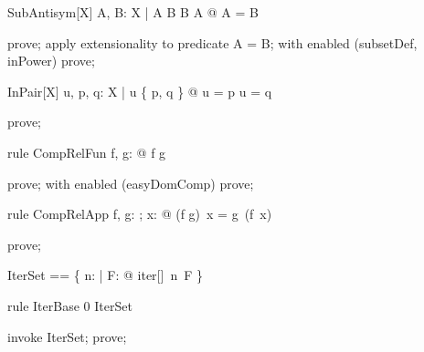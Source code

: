 \documentclass{article}
\begin{document}
\begin{theorem}{SubAntisym}[X]
  \forall A, B: \power X | A \subseteq B \land B \subseteq A @ A = B
\end{theorem}

\begin{zproof}
prove;
apply extensionality to predicate A = B;
with enabled (subsetDef, inPower) prove;
\end{zproof}

\begin{theorem}{InPair}[X]
  \forall u, p, q: X | u \in \{ p, q \} @ u = p \lor u = q
\end{theorem}

\begin{zproof}
prove;
\end{zproof}

\begin{theorem}{rule CompRelFun}
  \forall f, g: \nat \fun \nat @ f \comp[\nat, \nat, \nat] g \in \nat \fun \nat
\end{theorem}
\begin{zproof}
prove;
with enabled (easyDomComp) prove;
\end{zproof}

\begin{theorem}{rule CompRelApp}
  \forall f, g: \nat \fun \nat; x: \nat @ (f \comp[\nat, \nat, \nat] g)~x = g~(f~x)
\end{theorem}

\begin{zproof}
prove;
\end{zproof}

\begin{zed}
  IterSet == \{ n: \nat | \forall F: \nat \fun \nat @ iter[\nat]~n~F \in \nat \fun \nat \}
\end{zed}


\begin{theorem}{rule IterBase}
  0 \in IterSet
\end{theorem}

\begin{zproof}
invoke IterSet;
prove;
\end{zproof}
\end{document}
